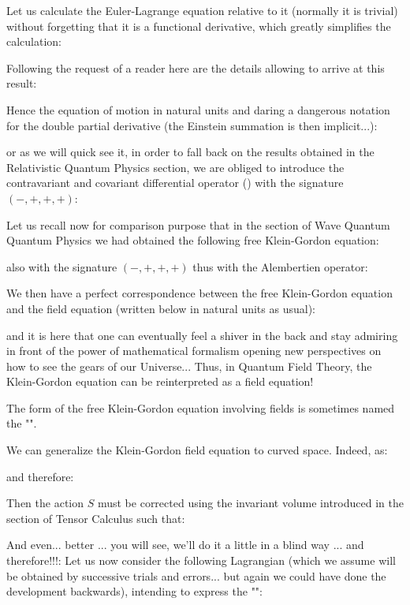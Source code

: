 	Let us calculate the Euler-Lagrange equation relative to it (normally it is trivial) without forgetting that it is a functional derivative, which greatly simplifies the calculation:
	
	Following the request of a reader here are the details allowing to arrive at this result:
	
	Hence the equation of motion in natural units and daring a dangerous notation for the double partial derivative (the Einstein summation is then implicit...):
	
	or as we will quick see it, in order to fall back on the results obtained in the Relativistic Quantum Physics section, we are obliged to introduce the contravariant and covariant differential operator () with the signature $(-, + , +, +)$:
	
	Let us recall now for comparison purpose that in the section of Wave Quantum Quantum Physics we had obtained the following free Klein-Gordon equation:
	
	also with the signature $(-, +, +, +)$ thus with the Alembertien operator:
	
	We then have a perfect correspondence between the free Klein-Gordon equation and the field equation (written below in natural units as usual):
	
	and it is here that one can eventually feel a shiver in the back and stay admiring in front of the power of mathematical formalism opening new perspectives on how to see the gears of our Universe... Thus, in Quantum Field Theory, the Klein-Gordon equation can be reinterpreted as a field equation! 

	The form of the free Klein-Gordon equation involving fields is sometimes named the "".
	\begin{tcolorbox}[title=Remark,colframe=black,arc=10pt]
	We can generalize the Klein-Gordon field equation to curved space. Indeed, as:
	
	and therefore:
	
	Then the action $S$ must be corrected using the invariant volume introduced in the section of Tensor Calculus such that:
	
	\end{tcolorbox}
	And even... better ... you will see, we'll do it a little in a blind way ... and therefore!!!: Let us now consider the following Lagrangian (which we assume will be obtained by successive trials and errors... but again we could have done the development backwards), intending to express the "":
	
